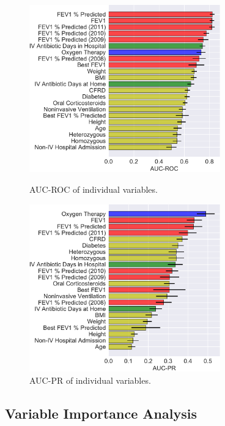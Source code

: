 \documentclass [PhD] {uclathes}
\begin{document}
\begin{figure}[!htbp] %
\begin{minipage}[b]{0.5\linewidth}
\includegraphics[width=3.25in]{ch6Fig5.pdf}
\caption{\small AUC-ROC of individual variables.}
\label{ch6fig5}
\end{minipage}\hfill
\begin{minipage}[b]{0.5\linewidth}
\centering
\includegraphics[width=3.25in]{ch6Fig6.pdf}
\caption{\small AUC-PR of individual variables.}
\label{ch6fig6}
\end{minipage}
\end{figure}

\subsection{Variable Importance Analysis} 
\end{document}
